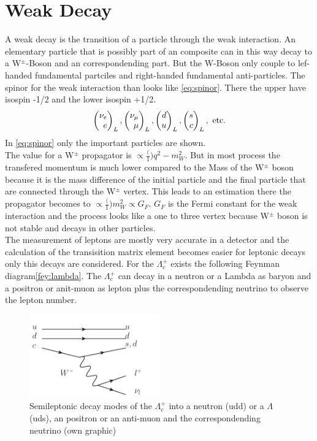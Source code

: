 \section{Weak Decay}
A weak decay is the transition of a particle through the weak interaction. An 
elementary particle that is possibly part of an composite can in this 
way decay to a W\(^\pm\)-Boson and an correspondending part. But the W-Boson only 
couple to lef-handed fundamental partciles and right-handed fundamental 
anti-particles. The spinor for the weak interaction than looks like 
{\eqref{eq:spinor}}. There the upper have isospin -1/2 and the lower isospin 
+1/2.
\begin{equation}
  \Spvek{\nu_e; e}_L,\Spvek{\nu_\mu; \mu}_L, \Spvek{d; u}_L, \Spvek{s; c}_L, 
  \text{ etc.} \label{eq:spinor}
\end{equation}
In {\eqref{eq:spinor}} only the important particles are shown.\\
The value for a W\(^\pm\) propagator is \(\propto \frac(1){q^2 - m_W^2}\). But 
in most process the transfered momentum is much lower compared to the Mass of 
the W\(^\pm\) boson because it is the mass 
difference of the initial particle and the final particle that are connected 
through the W\(^\pm\) vertex. This leads to an estimation there the propagator 
becomes to \(\propto \frac(1){m_W^2} \propto G_F\). \(G_F\) is the Fermi constant 
for the weak interaction and the process looks like a one to three vertex because 
W\(^\pm\) boson is not stable and decays in other particles.\\
The measurement of leptons are mostly very accurate in a detector and 
the calculation of the transisition matrix element becomes easier for leptonic 
decays only this decays are considered. For the \(\Lambda_c^+\) exists the 
following Feynman diagram{\eqref{fey:lambda}}. The \(\Lambda_c^+\) can decay 
in a neutron or a Lambda as baryon and a positron or anit-muon as lepton plus 
the correspondending neutrino to observe the lepton number.
\begin{figure}[h]
  \centering
  \includegraphics[page=1, width=0.5\textwidth]{semileptonic_lambdac+}
  \caption{Semileptonic decay modes of the \(\Lambda_c^+\) into a neutron (udd)
  or a \(\Lambda\) (uds), an positron or an anti-muon and the correspondending 
  neutrino (own graphic)}\label{fey:lambda}
\end{figure}

